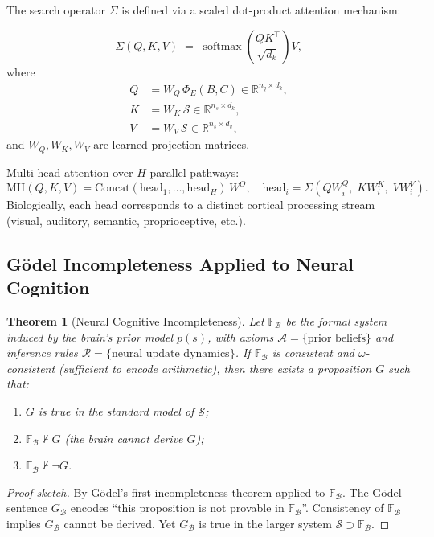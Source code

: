 \documentclass[12pt,a4paper]{article}
\theoremstyle{plain}
\newtheorem{theorem}{Theorem}[section]
\theoremstyle{definition}
\theoremstyle{remark}
\newcommand{\vS}{\mathcal{S}}
\newcommand{\vB}{\mathcal{B}}
\newcommand{\R}{\mathbb{R}}
\newcommand{\softmax}{\operatorname{softmax}}
\begin{document}
The search operator $\Sigma$ is defined via a scaled dot-product attention mechanism:
\begin{tcolorbox}[mathbox, title={Definition 3.4 — BQI Attention}]
\begin{equation}
  \Sigma(Q, K, V) \;=\; \softmax\!\left(\frac{Q K^\top}{\sqrt{d_k}}\right) V,
  \label{eq:attention}
\end{equation}
where
\begin{align}
  Q &= W_Q\,\Phi_E(B,C) \in \R^{n_q \times d_k}, \label{eq:Q}\\
  K &= W_K\,\vS \in \R^{n_s \times d_k},          \label{eq:K}\\
  V &= W_V\,\vS \in \R^{n_s \times d_v},          \label{eq:V}
\end{align}
and $W_Q, W_K, W_V$ are learned projection matrices.
\end{tcolorbox}

Multi-head attention over $H$ parallel pathways:
\begin{equation}
  \mathrm{MH}(Q,K,V) = \mathrm{Concat}(\mathrm{head}_1, \ldots, \mathrm{head}_H)\,W^O, \quad
  \mathrm{head}_i = \Sigma(QW_i^Q,\; KW_i^K,\; VW_i^V).
\end{equation}
Biologically, each head corresponds to a distinct cortical processing stream
(visual, auditory, semantic, proprioceptive, etc.).

\subsection{Gödel Incompleteness Applied to Neural Cognition}
\label{subsec:godel}

\begin{theorem}[Neural Cognitive Incompleteness]
Let $\mathbb{F}_\vB$ be the formal system induced by the brain's prior model $p(s)$,
with axioms $\mathcal{A} = \{\text{prior beliefs}\}$ and
inference rules $\mathcal{R} = \{\text{neural update dynamics}\}$.
If $\mathbb{F}_\vB$ is consistent and $\omega$-consistent (sufficient to encode arithmetic),
then there exists a proposition $G$ such that:
\begin{enumerate}[label=(\roman*)]
  \item $G$ is true in the standard model of $\vS$;
  \item $\mathbb{F}_\vB \not\vdash G$ (the brain cannot derive $G$);
  \item $\mathbb{F}_\vB \not\vdash \neg G$.
\end{enumerate}
\label{thm:godel}
\end{theorem}
\begin{proof}[Proof sketch]
By Gödel's first incompleteness theorem \citep{Godel1931} applied to $\mathbb{F}_\vB$.
The Gödel sentence $G_\vB$ encodes ``this proposition is not provable in $\mathbb{F}_\vB$''.
Consistency of $\mathbb{F}_\vB$ implies $G_\vB$ cannot be derived.
Yet $G_\vB$ is true in the larger system $\vS \supset \mathbb{F}_\vB$.
\end{proof}
\end{document}
